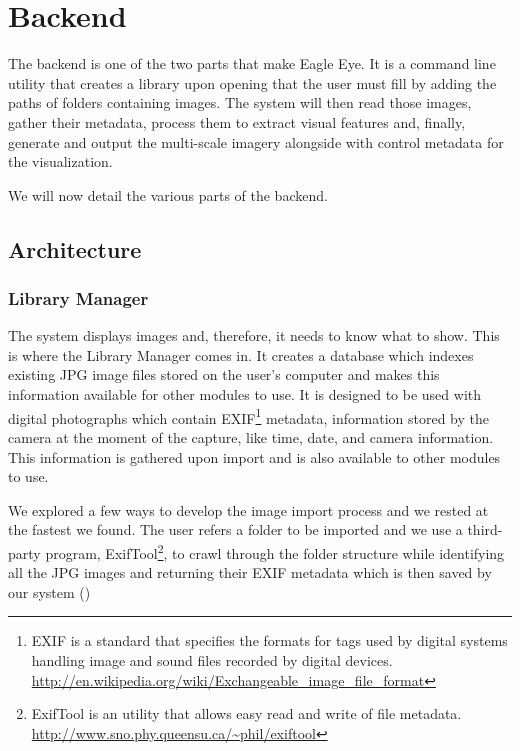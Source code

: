 \section{Backend} %
\label{sub:backend}

The backend is one of the two parts that make Eagle Eye. It is a command line utility that creates a library upon opening that the user must fill by adding the paths of folders containing images. The system will then read those images, gather their metadata, process them to extract visual features and, finally, generate and output the multi-scale imagery alongside with control metadata for the visualization.

We will now detail the various parts of the backend.

\subsection{Architecture}

\subsubsection{Library Manager} %
\label{ssub:library_manager}

The system displays images and, therefore, it needs to know what to show. This is where the Library Manager comes in. It creates a database which indexes existing JPG image files stored on the user's computer and makes this information available for other modules to use. It is designed to be used with digital photographs which contain \ac{EXIF}\footnote{\ac{EXIF} is a standard that specifies the formats for tags used by digital systems handling image and sound files recorded by digital devices. \url{http://en.wikipedia.org/wiki/Exchangeable_image_file_format}} metadata, information stored by the camera at the moment of the capture, like time, date, and camera information. This information is gathered upon import and is also available to  other modules to use.

We explored a few ways to develop the image import process and we rested at the fastest we found. The user refers a folder to be imported and we use a third-party program, ExifTool\footnote{ExifTool is an utility that allows easy read and write of file metadata. \url{http://www.sno.phy.queensu.ca/~phil/exiftool}}, to crawl through the folder structure while identifying all the JPG images and returning their \ac{EXIF} metadata which is then saved by our system ()

